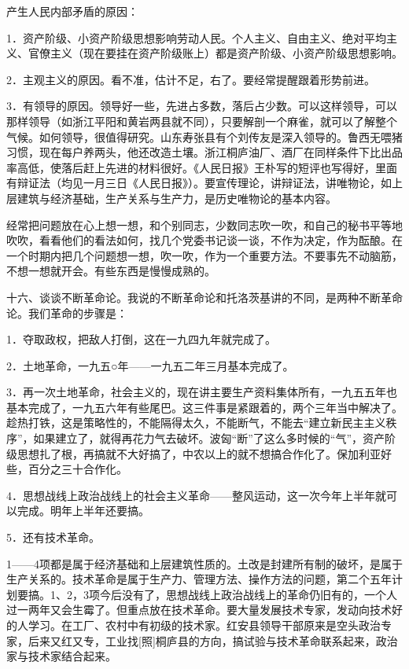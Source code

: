 产生人民内部矛盾的原因：

1．资产阶级、小资产阶级思想影响劳动人民。个人主义、自由主义、绝对平均主义、官僚主义（现在要挂在资产阶级账上）都是资产阶级、小资产阶级思想影响。

2．主观主义的原因。看不准，估计不足，右了。要经常提醒跟着形势前进。

3．有领导的原因。领导好一些，先进占多数，落后占少数。可以这样领导，可以那样领导（如浙江平阳和黄岩两县就不同），只要解剖一个麻雀，就可以了解整个气候。如何领导，很值得研究。山东寿张县有个刘传友是深入领导的。鲁西无喂猪习惯，现在每户养两头，他还改造土壤。浙江桐庐油厂、酒厂在同样条件下比出品率高低，使落后赶上先进的材料很好。《人民日报》王朴写的短评也写得好，里面有辩证法（均见一月三日《人民日报》）。要宣传理论，讲辩证法，讲唯物论，如上层建筑与经济基础，生产关系与生产力，是历史唯物论的基本内容。

经常把问题放在心上想一想，和个别同志，少数同志吹一吹，和自己的秘书平等地吹吹，看看他们的看法如何，找几个党委书记谈一谈，不作为决定，作为酝酿。在一个时期内把几个问题想一想，吹一吹，作为一个重要方法。不要事先不动脑筋，不想一想就开会。有些东西是慢慢成熟的。

十六、谈谈不断革命论。我说的不断革命论和托洛茨基讲的不同，是两种不断革命论。我们革命的步骤是：

1．夺取政权，把敌人打倒，这在一九四九年就完成了。

2．土地革命，一九五○年——一九五二年三月基本完成了。

3．再一次土地革命，社会主义的，现在讲主要生产资料集体所有，一九五五年也基本完成了，一九五六年有些尾巴。这三件事是紧跟着的，两个三年当中解决了。趁热打铁，这是策略性的，不能隔得太久，不能断气，不能去“建立新民主主义秩序”，如果建立了，就得再花力气去破坏。波匈“断”了这么多时候的“气”，资产阶级思想扎了根，再搞就不大好搞了，中农以上的就不想搞合作化了。保加利亚好些，百分之三十合作化。

4．思想战线上政治战线上的社会主义革命——整风运动，这一次今年上半年就可以完成。明年上半年还要搞。

5．还有技术革命。

1——4项都是属于经济基础和上层建筑性质的。土改是封建所有制的破坏，是属于生产关系的。技术革命是属于生产力、管理方法、操作方法的问题，第二个五年计划要搞。1、2，3项今后没有了，思想战线上政治战线上的革命仍旧有的，一个人过一两年又会生霉了。但重点放在技术革命。要大量发展技术专家，发动向技术好的人学习。在工厂、农村中有初级的技术家。红安县领导干部原来是空头政治专家，后来又红又专，工业找[照]桐庐县的方向，搞试验与技术革命联系起来，政治家与技术家结合起来。

